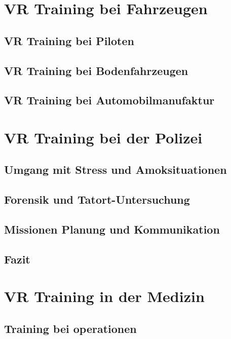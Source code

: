 \documentclass[
    12pt,
    a4paper,
    doubleside,
    BCOR=10mm,
    parskip=half,
    ngerman
]{scrbook}
\begin{document}
\chapter{VR Training bei Fahrzeugen}\label{sec:Fahrzeugen}

\section{VR Training bei Piloten}\label{sec:Piloten}

\section{VR Training bei Bodenfahrzeugen}\label{sec:Bodenfahrzeugen}

\section{VR Training bei Automobilmanufaktur}\label{sec:Automobilmanufaktur}

\chapter{VR Training bei der Polizei}\label{sec:polizei}

\section{Umgang mit Stress und Amoksituationen}\label{sec:polizei-SuA}

\section{Forensik und Tatort-Untersuchung}\label{sec:polizei-FuT}

\section{Missionen Planung und Kommunikation}\label{sec:polizei-PuK}

\section{Fazit}\label{sec:polizei-Fazit}

\chapter{VR Training in der Medizin}\label{sec:medizin}

\section{Training bei operationen}\label{sec:operationen}

\end{document}
